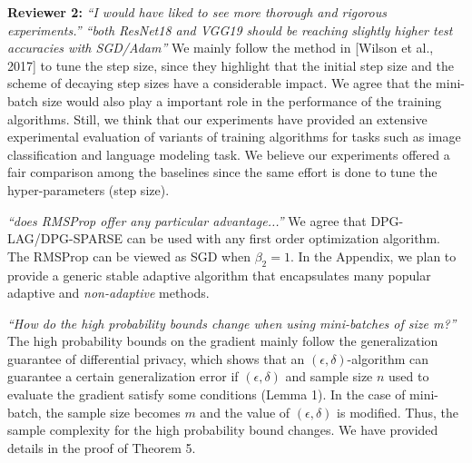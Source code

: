 \documentclass{article}
\begin{document}
\textbf{Reviewer 2:}
\textit{``I would have liked to see more thorough and rigorous experiments.'' ``both ResNet18 and VGG19 should be reaching slightly higher test accuracies with SGD/Adam''}
We mainly follow the method in [Wilson et al., 2017] to tune the step size, since they highlight that the initial step size and the scheme of decaying step sizes have a considerable impact. 
We agree that the mini-batch size would also play a important role in the performance of the training algorithms. 
Still, we think that our experiments have provided an extensive experimental evaluation of variants of training algorithms for tasks such as image classification and language modeling task. 
We believe our experiments offered a fair comparison among the baselines since the same effort is done to tune the hyper-parameters (step size). \vspace{-5pt}

    
\textit{``does RMSProp offer any particular advantage...''}
We agree that DPG-LAG/DPG-SPARSE can be used with any first order optimization algorithm. 
The RMSProp can be viewed as SGD when $\beta_2 = 1$. 
In the Appendix, we plan to provide a generic stable adaptive algorithm that encapsulates many popular adaptive and \emph{non-adaptive} methods. \vspace{-5pt}
    
    
\textit{``How do the high probability bounds change when using mini-batches of size m?''}
The high probability bounds on the gradient mainly follow the generalization guarantee of differential privacy, which shows that an $(\epsilon, \delta)$-algorithm can guarantee a certain  generalization error if $(\epsilon, \delta)$ and sample size $n$ used to evaluate the gradient satisfy some conditions (Lemma 1). 
In the case of mini-batch, the sample size becomes $m$ and the value of $(\epsilon, \delta)$ is modified. 
Thus, the sample complexity for the high probability bound changes. 
We have provided details in the proof of Theorem 5. \vspace{-5pt}
    
\end{document}
